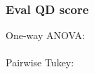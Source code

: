 \documentclass{article}
\begin{document}

    \subsubsection*{Eval QD score}
    One-way ANOVA:\\
    \\
    Pairwise Tukey:\\
    
\end{document}
